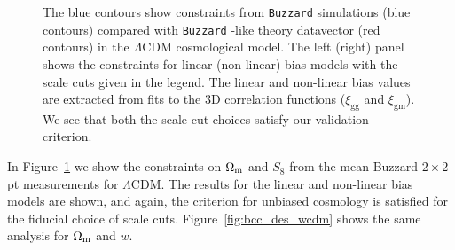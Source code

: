 \documentclass[fleqn,usenatbib]{mnras}
\newcommand{\xigg}{\ensuremath{\xi_{\mathrm{gg}}} }
\newcommand{\xigm}{\ensuremath{\xi_{\mathrm{gm}}} }
\newcommand{\lcdm}{$\Lambda$CDM}
\newcommand\fig[1]{Figure~\ref{#1}}
\newcommand{\buzzard}{\texttt{Buzzard} }
\newcommand{\IR}[1]{{\color{red}[\textbf{Note for IR}: #1]}}
\begin{document}
\begin{figure}
\caption[]{The blue contours show constraints from \buzzard simulations (blue contours) compared with  \buzzard-like theory datavector (red contours) in the $\Lambda$CDM cosmological model.
The left (right) panel shows the constraints for linear (non-linear) bias models with the scale cuts given in the legend. The linear and non-linear bias values are extracted from fits to the 3D correlation functions ($\xigg$ and $\xigm$). We see that both the scale cut choices satisfy our validation criterion. 
}
\label{fig:bcc_des_lcdm}
\end{figure}

In \fig{fig:bcc_des_lcdm} we show the constraints on $\Omega_{\rm m}$ and $S_8$ from the mean Buzzard $2\times2$pt measurements for \lcdm. The results for the linear and non-linear bias models are shown, and again, the criterion for unbiased cosmology is satisfied for the fiducial choice of scale cuts. 
\fig{fig:bcc_des_wcdm} shows the same analysis for $\Omega_{\rm m}$ and $w$.
\end{document}
